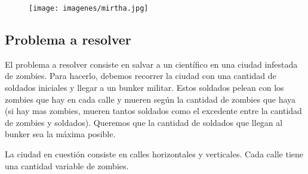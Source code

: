 \newcommand{\grafoCiudad}[7]{\grafoTikz{\ciudad{#1}{#2}{#3}{#4}{#5}{#6}{#7}}}
\newcommand{\grafoCiudadPlus}[8]{\grafoTikz{\ciudad{#1}{#2}{#3}{#4}{#5}{#6}{#7} `#8'}}
\newcommand{\grafoCiudadPlusVacia}[4]{\grafoTikz{\ciudadVacia{#1}{#2}{#3} `#4'}}

\newcommand{\graficarDatos}[6]{
  \begin{tikzpicture}
  \begin{axis}[
      title={#1},
      xlabel={#2},
      ylabel={#3},
      scaled x ticks=false,
      scaled y ticks=false,
      width=0.6\textwidth
  ]
  \addplot[only marks, color=black] table[x=#4,y=#5]{#6};
  \end{axis}
\end{tikzpicture}
}

\newcommand{\graficarDatosPlus}[7]{
  \begin{tikzpicture}
  \begin{axis}[
      title={#1},
      xlabel={#2},
      ylabel={#3},
      scaled x ticks=false,
      scaled y ticks=false,
      width=0.6\textwidth,
      #7
  ]
  \addplot[only marks, color=black] table[x=#4,y=#5]{#6};
  \end{axis}
\end{tikzpicture}
}


\begin{figure}[h]
\begin{center}
\texttt{[image: imagenes/mirtha.jpg]}
\end{center}
\end{figure}

\setlength{\multicolsep}{0pt}

\subsection{Problema a resolver}

El problema a resolver consiste en salvar a un científico en una ciudad infestada de zombies. Para hacerlo, debemos recorrer la ciudad con una cantidad de soldados iniciales y llegar a un bunker militar. Estos soldados pelean con los zombies que hay en cada calle y mueren según la cantidad de zombies que haya (si hay mas zombies, mueren tantos soldados como el excedente entre la cantidad de zombies y soldados). Queremos que la cantidad de soldados que llegan al bunker sea la máxima posible.

La ciudad en cuestión consiste en calles horizontales y verticales. Cada calle tiene una cantidad variable de zombies.


